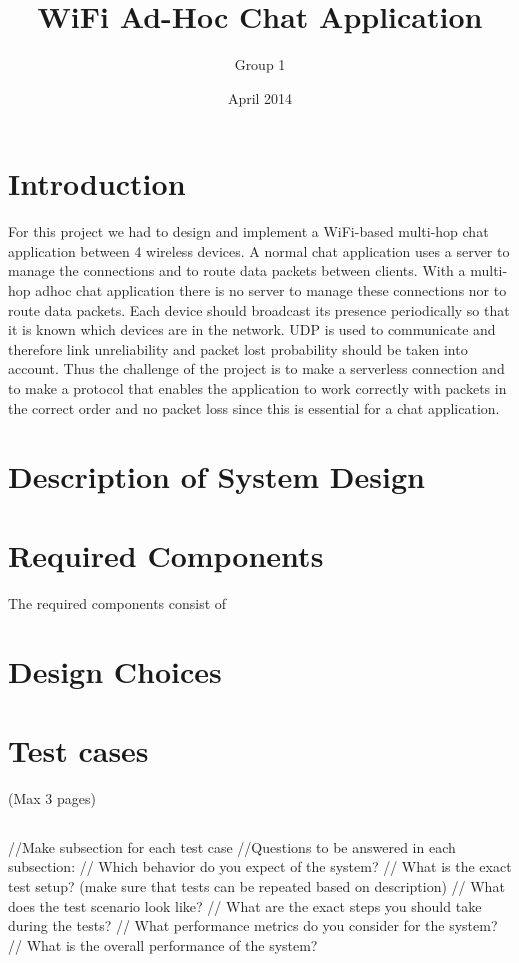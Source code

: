 \documentclass{report}
\title{WiFi Ad-Hoc Chat Application}
\author{Group 1}
\date{April 2014}
\begin{document}
\maketitle

\tableofcontents

\section{Introduction}
For this project we had to design and implement a WiFi-based multi-hop chat application between 4 wireless devices. A normal chat application uses a server to manage the connections and to route data packets between clients. With a multi-hop adhoc chat  application there is no server to manage these connections nor to route data packets. Each device should broadcast its presence periodically so that it is known which devices are in the network. UDP is used to communicate and therefore link unreliability and packet lost probability should be taken into account. Thus the challenge of the project is to make a serverless connection and to make a protocol that enables the application to work correctly with packets in the correct order and no packet loss since this is essential for a chat application.

\section{Description of System Design}

\section{Required Components}
The required components consist of 

\section{Design Choices}

\section{Test cases} (Max 3 pages)
\subsection{} //Make subsection for each test case
//Questions to be answered in each subsection:
// Which behavior do you expect of the system?
// What is the exact test setup? (make sure that tests can be repeated based on description)
// What does the test scenario look like?
// What are the exact steps you should take during the tests?
// What performance metrics do you consider for the system?
// What is the overall performance of the system?
\end{document}
